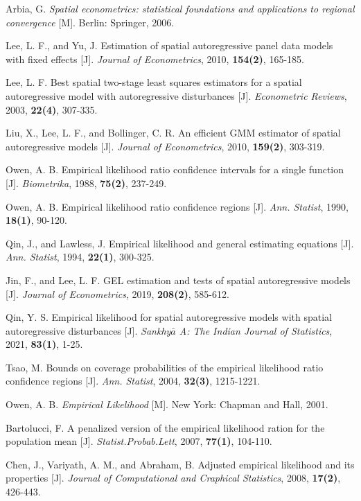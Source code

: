 \documentclass[a4paper,c5size,onecolumn,twoside,cap,Chinese]{APSart}
\begin{document}
\begin{thebibliography}{99}
 Arbia, G. {\it Spatial econometrics: statistical foundations and applications to regional convergence} [M]. Berlin: Springer, 2006. 

 Lee, L. F., and Yu,  J. Estimation of spatial autoregressive panel data models with fixed effects [J]. {\it Journal of Econometrics}, 2010, {\bf 154(2)}, 165-185. 

Lee, L. F. Best spatial two-stage least squares estimators for a spatial autoregressive model with autoregressive disturbances [J].  {\it Econometric Reviews}, 2003, {\bf 22(4)}, 307-335. 

 Liu, X., Lee, L. F., and Bollinger, C. R. An efficient GMM estimator of spatial autoregressive models [J]. {\it Journal of Econometrics}, 2010, {\bf 159(2)}, 303-319.

 Owen, A. B. Empirical likelihood ratio confidence intervals for a single function [J]. {\it Biometrika}, 1988, {\bf 75(2)}, 237-249.

 Owen, A. B. Empirical likelihood ratio confidence regions [J]. {\it Ann. Statist}, 1990, {\bf 18(1)}, 90-120.

Qin, J., and Lawless, J. Empirical likelihood and general estimating equations [J].  {\it Ann. Statist}, 1994, {\bf 22(1)}, 300-325.

 Jin, F., and Lee, L. F. GEL estimation and tests of spatial autoregressive models [J]. {\it Journal of Econometrics}, 2019, {\bf 208(2)}, 585-612.

 Qin, Y. S. Empirical likelihood for spatial autoregressive models with spatial autoregressive disturbances [J].  {\it Sankhy$\bar{a}$ A: The Indian Journal of Statistics}, 2021, {\bf 83(1)}, 1-25.

 Tsao, M. Bounds on coverage probabilities of the empirical likelihood ratio confidence regions [J].  {\it Ann. Statist}, 2004, {\bf 32(3)}, 1215-1221.

 Owen, A. B. {\it Empirical Likelihood} [M].  New York: Chapman and Hall, 2001.  

 Bartolucci, F. A penalized version of the empirical likelihood ration for the population mean [J].  {\it Statist.Probab.Lett}, 2007, {\bf 77(1)}, 104-110.

 Chen, J., Variyath, A. M., and Abraham, B. Adjusted empirical likelihood and its properties [J]. {\it Journal of Computational and Craphical Statistics}, 2008, {\bf17(2)}, 426-443.


\end{thebibliography}
\end{document}
